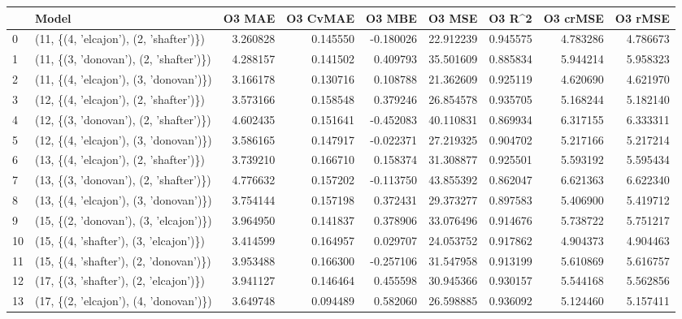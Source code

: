 \begin{tabular}{llrrrrrrr}
\toprule
{} &                                   Model &    O3 MAE &  O3 CvMAE &    O3 MBE &     O3 MSE &    O3 R\textasciicircum2 &  O3 crMSE &   O3 rMSE \\
\midrule
0  &  (11, \{(4, 'elcajon'), (2, 'shafter')\}) &  3.260828 &  0.145550 & -0.180026 &  22.912239 &  0.945575 &  4.783286 &  4.786673 \\
1  &  (11, \{(3, 'donovan'), (2, 'shafter')\}) &  4.288157 &  0.141502 &  0.409793 &  35.501609 &  0.885834 &  5.944214 &  5.958323 \\
2  &  (11, \{(4, 'elcajon'), (3, 'donovan')\}) &  3.166178 &  0.130716 &  0.108788 &  21.362609 &  0.925119 &  4.620690 &  4.621970 \\
3  &  (12, \{(4, 'elcajon'), (2, 'shafter')\}) &  3.573166 &  0.158548 &  0.379246 &  26.854578 &  0.935705 &  5.168244 &  5.182140 \\
4  &  (12, \{(3, 'donovan'), (2, 'shafter')\}) &  4.602435 &  0.151641 & -0.452083 &  40.110831 &  0.869934 &  6.317155 &  6.333311 \\
5  &  (12, \{(4, 'elcajon'), (3, 'donovan')\}) &  3.586165 &  0.147917 & -0.022371 &  27.219325 &  0.904702 &  5.217166 &  5.217214 \\
6  &  (13, \{(4, 'elcajon'), (2, 'shafter')\}) &  3.739210 &  0.166710 &  0.158374 &  31.308877 &  0.925501 &  5.593192 &  5.595434 \\
7  &  (13, \{(3, 'donovan'), (2, 'shafter')\}) &  4.776632 &  0.157202 & -0.113750 &  43.855392 &  0.862047 &  6.621363 &  6.622340 \\
8  &  (13, \{(4, 'elcajon'), (3, 'donovan')\}) &  3.754144 &  0.157198 &  0.372431 &  29.373277 &  0.897583 &  5.406900 &  5.419712 \\
9  &  (15, \{(2, 'donovan'), (3, 'elcajon')\}) &  3.964950 &  0.141837 &  0.378906 &  33.076496 &  0.914676 &  5.738722 &  5.751217 \\
10 &  (15, \{(4, 'shafter'), (3, 'elcajon')\}) &  3.414599 &  0.164957 &  0.029707 &  24.053752 &  0.917862 &  4.904373 &  4.904463 \\
11 &  (15, \{(4, 'shafter'), (2, 'donovan')\}) &  3.953488 &  0.166300 & -0.257106 &  31.547958 &  0.913199 &  5.610869 &  5.616757 \\
12 &  (17, \{(3, 'shafter'), (2, 'elcajon')\}) &  3.941127 &  0.146464 &  0.455598 &  30.945366 &  0.930157 &  5.544168 &  5.562856 \\
13 &  (17, \{(2, 'elcajon'), (4, 'donovan')\}) &  3.649748 &  0.094489 &  0.582060 &  26.598885 &  0.936092 &  5.124460 &  5.157411 \\

\end{tabular}
